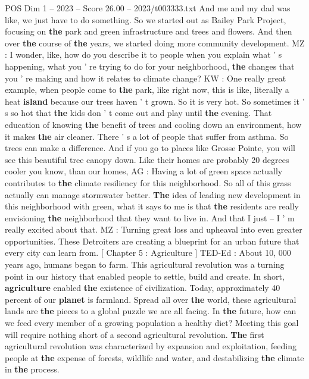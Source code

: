\begin{textsample}{POS Dim 1 – 2023 – Score 26.00 – 2023/t003333.txt}
And me and my dad was like, we just have to do something.
So we started out as Bailey Park Project, focusing on \textbf{the} park and green infrastructure and trees and flowers.
And then over \textbf{the} course of \textbf{the} years, we started doing more community development.
MZ : I wonder, like, how do you describe it to people when you explain what ' s happening, what you ' re trying to do for your neighborhood, \textbf{the} changes that you ' re making and how it relates to climate change?
KW : One really great example, when people come to \textbf{the} park, like right now, this is like, literally a heat \textbf{island} because our trees haven ' t grown.
So it is very hot.
So sometimes it ' s so hot that \textbf{the} kids don ' t come out and play until \textbf{the} evening.
That education of knowing \textbf{the} benefit of trees and cooling down an environment, how it makes \textbf{the} air cleaner.
There ' s a lot of people that suffer from asthma.
So trees can make a difference.
And if you go to places like Grosse Pointe, you will see this beautiful tree canopy down.
Like their homes are probably 20 degrees cooler you know, than our homes, AG : Having a lot of green space actually contributes to \textbf{the} climate resiliency for this neighborhood.
So all of this grass actually can manage stormwater better. \textbf{The} idea of leading new development in this neighborhood with green, what it says to me is that \textbf{the} residents are really envisioning \textbf{the} neighborhood that they want to live in.
And that I just -- I ' m really excited about that.
MZ : Turning great loss and upheaval into even greater opportunities.
These Detroiters are creating a blueprint for an urban future that every city can learn from. [ Chapter 5 : Agriculture ] TED-Ed : About 10, 000 years ago, humans began to farm.
This agricultural revolution was a turning point in our history that enabled people to settle, build and create.
In short, \textbf{agriculture} enabled \textbf{the} existence of civilization.
Today, approximately 40 percent of our \textbf{planet} is farmland.
Spread all over \textbf{the} world, these agricultural lands are \textbf{the} pieces to a global puzzle we are all facing.
In \textbf{the} future, how can we feed every member of a growing population a healthy diet?
Meeting this goal will require nothing short of a second agricultural revolution. \textbf{The} first agricultural revolution was characterized by expansion and exploitation, feeding people at \textbf{the} expense of forests, wildlife and water, and destabilizing \textbf{the} climate in \textbf{the} process.

\end{textsample}
